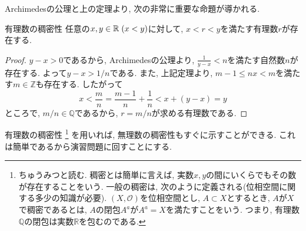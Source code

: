\documentclass[a4j,dvipdfmx]{jsarticle}
\numberwithin{equation}{section}
\begin{document}
            Archimedesの公理と上の定理より, 次の非常に重要な命題が導かれる.
            \begin{itembox}{有理数の稠密性}
                任意の$x,y\in\mathbb{R}\hspace{1mm}(x<y)$に対して, $x<r<y$を満たす有理数$r$が存在する.
            \end{itembox}
            \begin{proof}
                $y-x>0$であるから, Archimedesの公理より, $\frac{1}{y-x}<n$を満たす自然数$n$が存在する. よって$y-x>1/n$である. 
                また, 上記定理より, $m-1\leq nx < m$を満たす$m\in\mathbb{Z}$も存在する. したがって
                \begin{equation*}
                    x<\frac{m}{n}=\frac{m-1}{n}+\frac{1}{n}<x+(y-x)=y
                \end{equation*}
                ところで, $m/n\in\mathbb{Q}$であるから, $r=m/n$が求める有理数である.
            \end{proof}
            有理数の稠密性
            \footnote{ちゅうみつと読む. 稠密とは簡単に言えば, 実数$x,y$の間にいくらでもその数が存在することをいう. 一般の稠密は, 次のように定義される(位相空間に関する多少の知識が必要). 
            $(X,\mathcal{O})$を位相空間とし, $A\subset X$とするとき, $A$が$X$で稠密であるとは, $A$の閉包$A^a$が$A^a=X$を満たすことをいう. 
            つまり, 有理数$\mathbb{Q}$の閉包は実数$\mathbb{R}$を包むのである.}
            を用いれば, 無理数の稠密性もすぐに示すことができる. これは簡単であるから演習問題に回すことにする.
            \clearpage
            
\end{document}
